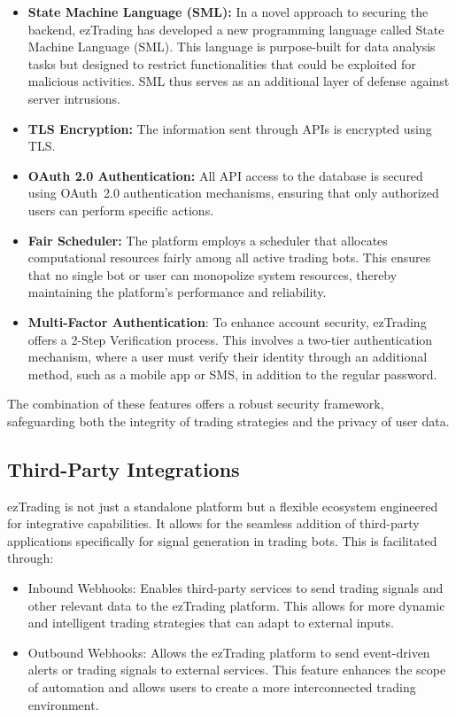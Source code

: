 \begin{itemize}
  \item \textbf{State Machine Language (SML):} In a novel approach to securing the backend, ezTrading has developed a new programming language called State Machine Language (SML). This language is purpose-built for data analysis tasks but designed to restrict functionalities that could be exploited for malicious activities. SML thus serves as an additional layer of defense against server intrusions.

  \item \textbf{TLS Encryption:} The information sent through APIs is encrypted using TLS.

  \item \textbf{OAuth 2.0 Authentication:} All API access to the database is secured using OAuth~2.0 authentication mechanisms, ensuring that only authorized users can perform specific actions.

  \item \textbf{Fair Scheduler:} The platform employs a scheduler that allocates computational resources fairly among all active trading bots. This ensures that no single bot or user can monopolize system resources, thereby maintaining the platform's performance and reliability.
  
  \item \textbf{Multi-Factor Authentication}: To enhance account security, ezTrading offers a 2-Step Verification process. This involves a two-tier authentication mechanism, where a user must verify their identity through an additional method, such as a mobile app or SMS, in addition to the regular password.
\end{itemize}

The combination of these features offers a robust security framework, safeguarding both the integrity of trading strategies and the privacy of user data.

\subsection{Third-Party Integrations}
\label{subsec:third-party-integrations}

ezTrading is not just a standalone platform but a flexible ecosystem engineered for integrative capabilities. It allows for the seamless addition of third-party applications specifically for signal generation in trading bots. This is facilitated through:

\begin{itemize}
  \item Inbound Webhooks: Enables third-party services to send trading signals and other relevant data to the ezTrading platform. This allows for more dynamic and intelligent trading strategies that can adapt to external inputs.
  \item Outbound Webhooks: Allows the ezTrading platform to send event-driven alerts or trading signals to external services. This feature enhances the scope of automation and allows users to create a more interconnected trading environment.
\end{itemize}

